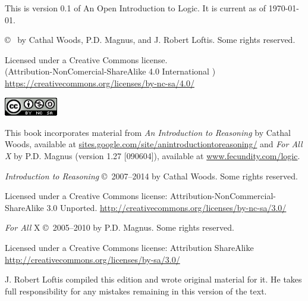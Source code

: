 \thispagestyle{empty}%
This is version 0.1 of An Open Introduction to Logic. It is current as of \today. %

\vfill

{\copyright\  by Cathal Woods, P.D. Magnus, and J. Robert Loftis. Some rights reserved. }

\begin{adjustwidth}{2em}{0em}
{\footnotesize Licensed under a Creative Commons license.\\
	(Attribution-NonComercial-ShareAlike 4.0 International )
	\url{https://creativecommons.org/licenses/by-nc-sa/4.0/}


\includegraphics[width=66pt, height=23pt, keepaspectratio=true]{img/cc-by-nc-sa.png}

}

\end{adjustwidth}

\vfill

This book incorporates material from \emph{An Introduction to Reasoning} by Cathal Woods, available at \url{sites.google.com/site/anintroductiontoreasoning/}
and \emph{For All X} by P.D. Magnus (version 1.27 [090604]), available at \url{www.fecundity.com/logic}.


\textit{Introduction to Reasoning} \copyright\ 2007--2014 by Cathal Woods. Some rights reserved.

\begin{adjustwidth}{2em}{0em}
{\footnotesize Licensed under a Creative Commons license: Attribution-NonCommercial-ShareAlike 3.0 Unported. \url{http://creativecommons.org/licenses/by-nc-sa/3.0/}}
\end{adjustwidth}

\textit{For All} X \copyright\  2005--2010 by P.D. Magnus. Some rights reserved.

\begin{adjustwidth}{2em}{0em}
{\footnotesize Licensed under a Creative Commons license: Attribution ShareAlike \url{http://creativecommons.org/licenses/by-sa/3.0/}}
\end{adjustwidth}

\vfill

J. Robert Loftis compiled this edition and wrote original material for it. He takes full responsibility for any mistakes remaining in this version of the text.


